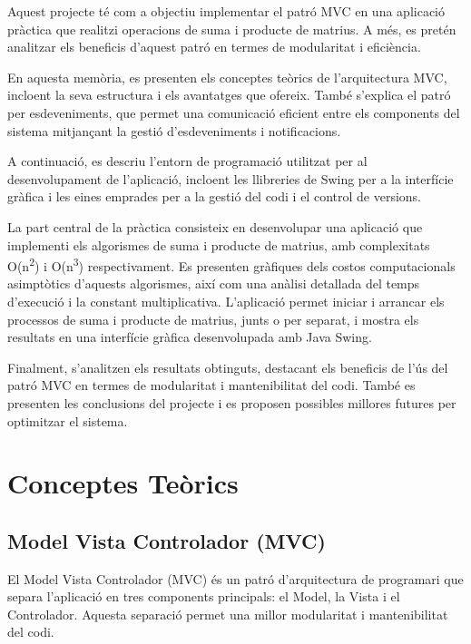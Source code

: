 \documentclass{ieeetj}
\begin{document}
Aquest projecte té com a objectiu implementar el patró MVC en una aplicació pràctica que realitzi operacions de suma i producte de matrius. A més, es pretén analitzar els beneficis d'aquest patró en termes de modularitat i eficiència.

En aquesta memòria, es presenten els conceptes teòrics de l'arquitectura MVC, incloent la seva estructura i els avantatges que ofereix. També s'explica el patró per esdeveniments, que permet una comunicació eficient entre els components del sistema mitjançant la gestió d'esdeveniments i notificacions.

A continuació, es descriu l'entorn de programació utilitzat per al desenvolupament de l'aplicació, incloent les llibreries de Swing per a la interfície gràfica i les eines emprades per a la gestió del codi i el control de versions.

La part central de la pràctica consisteix en desenvolupar una aplicació que implementi els algorismes de suma i producte de matrius, amb complexitats O(n\textsuperscript{2}) i O(n\textsuperscript{3}) respectivament. Es presenten gràfiques dels costos computacionals asimptòtics d'aquests algorismes, així com una anàlisi detallada del temps d'execució i la constant multiplicativa. L'aplicació permet iniciar i arrancar els processos de suma i producte de matrius, junts o per separat, i mostra els resultats en una interfície gràfica desenvolupada amb Java Swing.

Finalment, s'analitzen els resultats obtinguts, destacant els beneficis de l'ús del patró MVC en termes de modularitat i mantenibilitat del codi. També es presenten les conclusions del projecte i es proposen possibles millores futures per optimitzar el sistema.

\section{Conceptes Teòrics}
\subsection{Model Vista Controlador (MVC)}
El Model Vista Controlador (MVC) és un patró d'arquitectura de programari que separa l'aplicació en tres components principals: el Model, la Vista i el Controlador. Aquesta separació permet una millor modularitat i mantenibilitat del codi.
\end{document}
